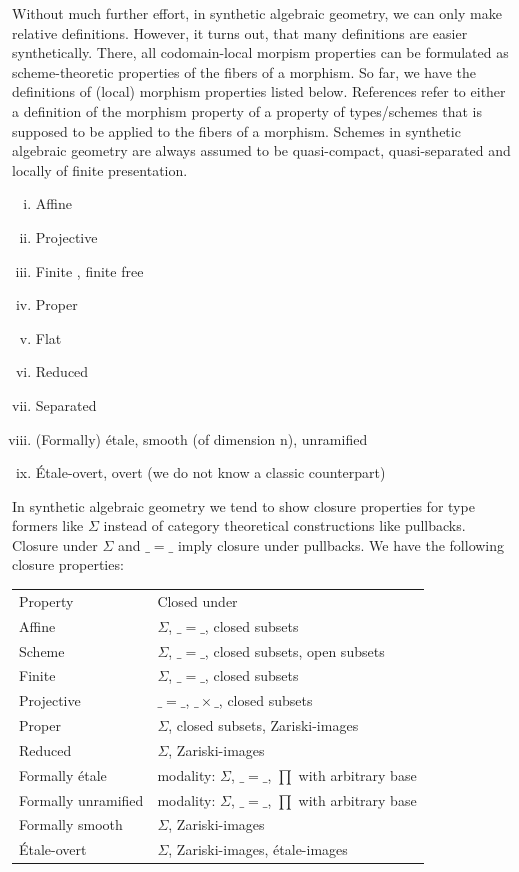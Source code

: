 Without much further effort, in synthetic algebraic geometry, we can only make relative definitions. However, it turns out, that many definitions are easier synthetically. There, all codomain-local morpism properties can be formulated as scheme-theoretic properties of the fibers of a morphism.
So far, we have the definitions of (local) morphism properties listed below. References refer to either a definition of the morphism property of a property of types/schemes that is supposed to be applied to the fibers of a morphism. Schemes in synthetic algebraic geometry are always assumed to be quasi-compact, quasi-separated and locally of finite presentation.
\begin{center}
\begin{enumerate}[(i)]
\item Affine \cite{draft}
\item Projective \cite{proper-draft}
\item Finite \cite{finite-draft}, finite free
\item Proper \cite{proper-draft}
\item Flat
\item Reduced
\item Separated
\item (Formally) étale, smooth (of dimension n), unramified \cite{diffgeo-article}
\item Étale-overt, overt (we do not know a classic counterpart) \cite{27-lines-draft}
\end{enumerate}  
\end{center}
In synthetic algebraic geometry we tend to show closure properties for type formers like $\Sigma$ instead of category theoretical constructions like pullbacks. Closure under $\Sigma$ and $\_=\_$ imply closure under pullbacks.
We have the following closure properties:
\begin{center}
  \begin{tabular}{ll}
    Property & Closed under \\
    Affine & $\Sigma$, $\_=\_$, closed subsets \\
    Scheme & $\Sigma$, $\_=\_$, closed subsets, open subsets \\
    Finite & $\Sigma$, $\_=\_$, closed subsets \\
    Projective & $\_=\_$, $\_\times\_$, closed subsets \\
    Proper & $\Sigma$, closed subsets, Zariski-images \\
    Reduced & $\Sigma$, Zariski-images \\
    
    Formally étale & modality: $\Sigma$, $\_=\_$, $\prod$ with arbitrary base \\ 
    Formally unramified & modality: $\Sigma$, $\_=\_$, $\prod$ with arbitrary base \\
    Formally smooth & $\Sigma$, Zariski-images \\
    Étale-overt & $\Sigma$, Zariski-images, étale-images \\
  \end{tabular}
\end{center}
